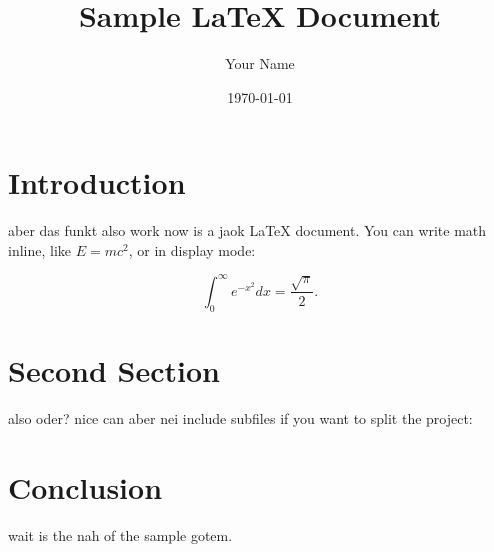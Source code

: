 \documentclass[12pt]{article}
\title{Sample LaTeX Document}
\author{Your Name}
\date{\today}
\begin{document}
\maketitle

\tableofcontents
\newpage

\section{Introduction}

aber das funkt also work now is a jaok LaTeX document. You can write math inline, like $E = mc^2$, or in display mode:

\[
\int_0^\infty e^{-x^2} dx = \frac{\sqrt{\pi}}{2}.
\]

\section{Second Section}

also oder? nice can aber nei include subfiles if you want to split the project:

%

\section{Conclusion}

wait is the nah of the sample gotem.
\end{document}

